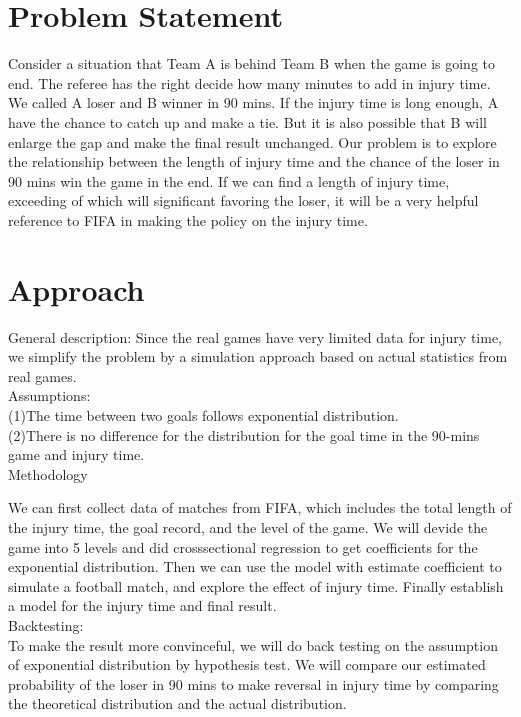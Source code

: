 \documentclass[12pt,letterpaper]{article}
\theoremstyle{definition}
\begin{document}
\section{Problem Statement}

Consider a situation that Team A is behind Team B when the game is going to end. The referee has the right decide how many minutes to add in injury time. We called A loser and B winner in 90 mins. If the injury time is long enough, A have the chance to catch up and make a tie. But it is also possible that B will enlarge the gap and make the final result unchanged. Our problem is to explore the relationship between the length of injury time and the chance of the loser in 90 mins win the game in the end. If we can find a length of injury time, exceeding of which will significant favoring the loser, it will be a very helpful reference to FIFA in making the policy on the injury time.

\section{Approach}
General description:
Since the real games have very limited data for injury time, we simplify the problem by a simulation approach based on actual statistics from real games. 
\\Assumptions:
\\(1)The time between two goals follows exponential distribution.
\\(2)There is no difference for the distribution for the goal time in the 90-mins game and injury time.
\\Methodology  \cite{IMM1978}

We can first collect data of matches from FIFA, which includes the total length of the injury time, the goal record, and the level of the game. We will devide the game into 5 levels and did crosssectional regression to get coefficients for the exponential distribution. Then we can use the model with estimate coefficient to simulate a football match, and explore the effect of injury time. Finally establish a model for the injury time and final result.
\\Backtesting:
\\To make the result more convinceful, we will do back testing on the assumption of exponential distribution by hypothesis test. We will compare our estimated probability of the loser in 90 mins to make reversal in injury time by comparing the theoretical distribution and the actual distribution. 
\end{document}
